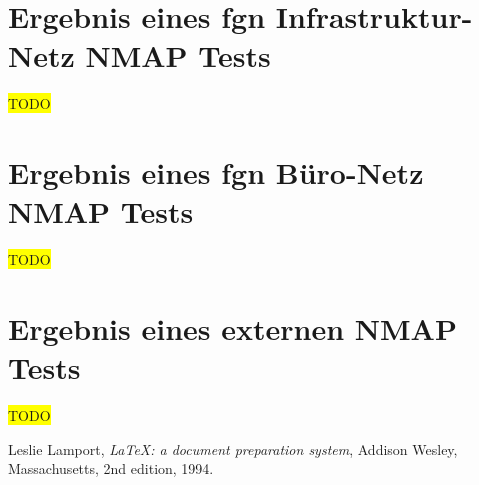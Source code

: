 \documentclass[11pt,a4paper,titlepage=firstiscover,headsepline,bibtotoc]{scrartcl} %
\newcommand{\hilight}[1]{\colorbox{yellow}{#1}} %
\begin{document}
\newpage
\section{Ergebnis eines fgn Infrastruktur-Netz NMAP Tests}\label{sec:NMAP-Test-int}
\hilight{TODO}
\newpage
\section{Ergebnis eines fgn Büro-Netz NMAP Tests}\label{sec:NMAP-Test-mid}
\hilight{TODO}
\newpage
\section{Ergebnis eines externen NMAP Tests}\label{sec:NMAP-Test-ext}
\hilight{TODO}
\newpage

\nocite{*}
\begin{thebibliography}{9}

  Leslie Lamport,
  \emph{\LaTeX: a document preparation system},
  Addison Wesley, Massachusetts,
  2nd edition,
  1994.

\end{thebibliography}
\end{document}
